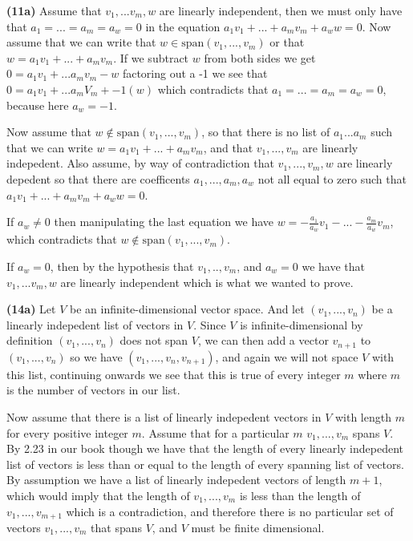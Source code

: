 \documentclass{article}
\begin{document}
\vspace{3mm}

\noindent\textbf{(11a)} Assume that $v_1,...v_m, w$ are linearly independent, then we must only have that $a_1 = ... =a_m = a_w = 0$ in the equation $a_1v_1 + ... + a_mv_m + a_ww = 0$. Now assume that we can write that $w \in \text{span}(v_1,...,v_m)$ or that $w = a_1v_1 + ... +a_mv_m$. If we subtract $w$ from both sides we get $0 = a_1v_1 + ... a_mv_m - w$ factoring out a -1 we see that $0 = a_1v_1 + ... a_mV_m + -1(w)$ which contradicts that $a_1 = ... =a_m = a_w = 0$, because here $a_w = -1$.

\noindent Now assume that $w \notin \text{span}(v_1,...,v_m)$, so that there is no list of $a_1...a_m$ such that we can write $w = a_1v_1 + ... +a_mv_m$, and that $v_1,...,v_m$ are linearly indepedent. Also assume, by way of contradiction that $v_1,...,v_m,w$ are linearly depedent so that there are coefficents $a_1,...,a_m,a_w$ not all equal to zero such that $a_1v_1 + ... + a_mv_m + a_ww = 0$.

\vspace{3mm}

\noindent If $a_w \neq 0$ then manipulating the last equation we have $w = -\frac{a_1}{a_w}v_1 - ... - \frac{a_m}{a_w}v_m$, which contradicts that  $w \notin \text{span}(v_1,...,v_m)$.


\noindent If $a_w = 0$, then by the hypothesis that $v_1,..,v_m$, and $a_w = 0$ we have that $v_1,...v_m,w$ are linearly independent which is what we wanted to prove.

\newpage

\noindent\textbf{(14a)} Let $V$ be an infinite-dimensional vector space. And let $(v_1,...,v_n)$ be a linearly indepedent list of vectors in $V$. Since $V$ is infinite-dimensional by definition $(v_1,...,v_n)$ does not span $V$, we can then add a vector $v_{n+1}$ to $(v_1,...,v_n)$ so we have $(v_1,...,v_n, v_{n+1})$, and again we will not space $V$ with this list, continuing onwards we see that this is true of every integer $m$ where $m$ is the number of vectors in our list.

\vspace{3mm}

\noindent Now assume that there is a list of linearly indepedent vectors in $V$ with length $m$ for every positive integer $m$. Assume that for a particular $m$ $v_1,...,v_m$ spans $V$. By 2.23 in our book though we have that the length of every linearly indepedent list of vectors is less than or equal to the length of every spanning list of vectors. By assumption we have a list of linearly indepedent vectors of length $m+1$, which would imply that the length of $v_1,...,v_m$ is less than the length of $v_1,...,v_{m+1}$ which is a contradiction, and therefore there is no particular set of vectors $v_1,...,v_m$ that spans $V$, and $V$ must be finite dimensional.
\end{document}
